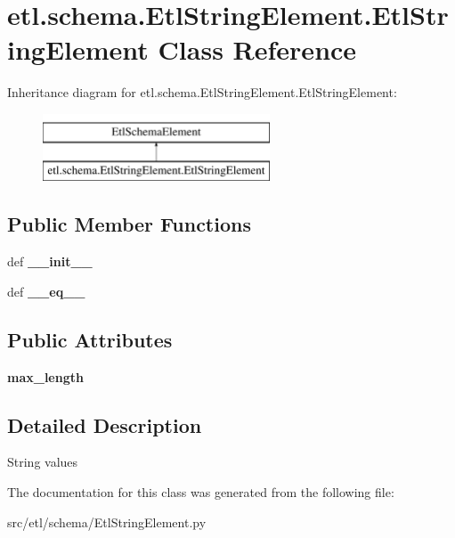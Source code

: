 \hypertarget{classetl_1_1schema_1_1EtlStringElement_1_1EtlStringElement}{\section{etl.\-schema.\-Etl\-String\-Element.\-Etl\-String\-Element Class Reference}
\label{classetl_1_1schema_1_1EtlStringElement_1_1EtlStringElement}
}
Inheritance diagram for etl.\-schema.\-Etl\-String\-Element.\-Etl\-String\-Element\-:\begin{figure}[H]
\begin{center}
\leavevmode
\includegraphics[height=2.000000cm]{classetl_1_1schema_1_1EtlStringElement_1_1EtlStringElement}
\end{center}
\end{figure}
\subsection*{Public Member Functions}
\begin{DoxyCompactItemize}
\item 
\hypertarget{classetl_1_1schema_1_1EtlStringElement_1_1EtlStringElement_ac0083f4dffbce05bcd19a6c3abb6c565}{def {\bfseries \-\_\-\-\_\-init\-\_\-\-\_\-}}\label{classetl_1_1schema_1_1EtlStringElement_1_1EtlStringElement_ac0083f4dffbce05bcd19a6c3abb6c565}

\item 
\hypertarget{classetl_1_1schema_1_1EtlStringElement_1_1EtlStringElement_ab3afd9e24dd1e7c3fc11411b3e72b7ad}{def {\bfseries \-\_\-\-\_\-eq\-\_\-\-\_\-}}\label{classetl_1_1schema_1_1EtlStringElement_1_1EtlStringElement_ab3afd9e24dd1e7c3fc11411b3e72b7ad}

\end{DoxyCompactItemize}
\subsection*{Public Attributes}
\begin{DoxyCompactItemize}
\item 
\hypertarget{classetl_1_1schema_1_1EtlStringElement_1_1EtlStringElement_aab58b4a15650b65087d0d237b0d9dd7b}{{\bfseries max\-\_\-length}}\label{classetl_1_1schema_1_1EtlStringElement_1_1EtlStringElement_aab58b4a15650b65087d0d237b0d9dd7b}

\end{DoxyCompactItemize}


\subsection{Detailed Description}
\begin{DoxyVerb}String values\end{DoxyVerb}
 

The documentation for this class was generated from the following file\-:\begin{DoxyCompactItemize}
\item 
src/etl/schema/Etl\-String\-Element.\-py\end{DoxyCompactItemize}
